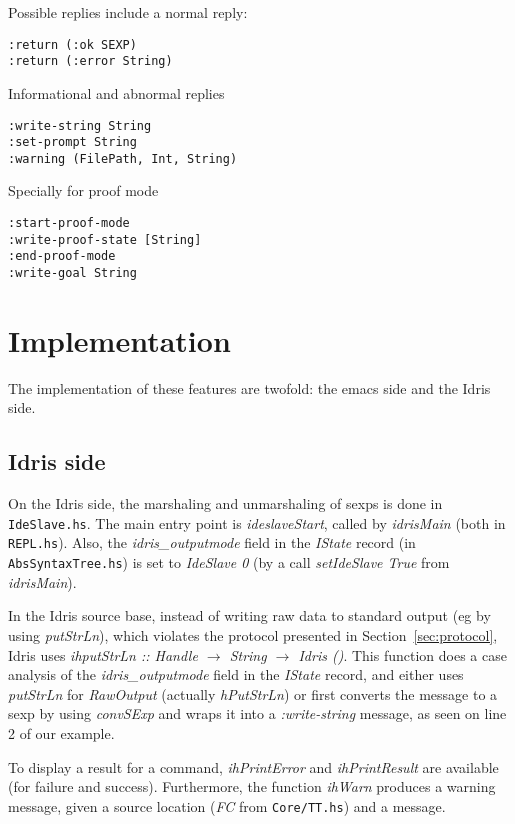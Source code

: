 \documentclass{article}
\begin{document}
Possible replies include a normal reply:
\begin{verbatim}
:return (:ok SEXP)
:return (:error String)
\end{verbatim}

Informational and abnormal replies
\begin{verbatim}
:write-string String
:set-prompt String
:warning (FilePath, Int, String)
\end{verbatim}

Specially for proof mode
\begin{verbatim}
:start-proof-mode
:write-proof-state [String]
:end-proof-mode
:write-goal String
\end{verbatim}

\section{Implementation}
The implementation of these features are twofold: the emacs side and the Idris side.

\subsection{Idris side}
On the Idris side, the marshaling and unmarshaling of sexps is done in \texttt{IdeSlave.hs}.
The main entry point is \emph{ideslaveStart}, called by \emph{idrisMain} (both in \texttt{REPL.hs}).
Also, the \emph{idris\_outputmode} field in the \emph{IState} record (in \texttt{AbsSyntaxTree.hs}) is set to \emph{IdeSlave 0} (by a call \emph{setIdeSlave True} from \emph{idrisMain}).

In the Idris source base, instead of writing raw data to standard output (eg by using \emph{putStrLn}), which violates the protocol presented in Section~\ref{sec:protocol}, Idris uses \emph{ihputStrLn :: Handle $\rightarrow$ String $\rightarrow$ Idris ()}.
This function does a case analysis of the \emph{idris\_outputmode} field in the \emph{IState} record, and either uses \emph{putStrLn} for \emph{RawOutput} (actually \emph{hPutStrLn}) or first converts the message to a sexp by using \emph{convSExp} and wraps it into a \emph{:write-string} message, as seen on line 2 of our example.

To display a result for a command, \emph{ihPrintError} and \emph{ihPrintResult} are available (for failure and success).
Furthermore, the function \emph{ihWarn} produces a warning message, given a source location (\emph{FC} from \texttt{Core/TT.hs}) and a message.
\end{document}
